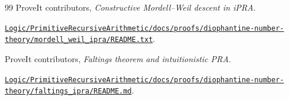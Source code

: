 \begin{thebibliography}{99}
 ProveIt contributors, \emph{Constructive Mordell--Weil descent in iPRA}.\par\nopagebreak\href{https://github.com/VladimirReshetnikov/ProveIt/blob/052fbaebfc955294b4c02f6532ab7e7a3f760f7a/Logic/PrimitiveRecursiveArithmetic/docs/proofs/diophantine-number-theory/mordell_weil_ipra/README.txt}{\nolinkurl{Logic/PrimitiveRecursiveArithmetic/docs/proofs/diophantine-number-theory/mordell_weil_ipra/README.txt}}.

 ProveIt contributors, \emph{Faltings theorem and intuitionistic PRA}.\par\nopagebreak\href{https://github.com/VladimirReshetnikov/ProveIt/blob/052fbaebfc955294b4c02f6532ab7e7a3f760f7a/Logic/PrimitiveRecursiveArithmetic/docs/proofs/diophantine-number-theory/faltings_ipra/README.md}{\nolinkurl{Logic/PrimitiveRecursiveArithmetic/docs/proofs/diophantine-number-theory/faltings_ipra/README.md}}.

\end{thebibliography}
